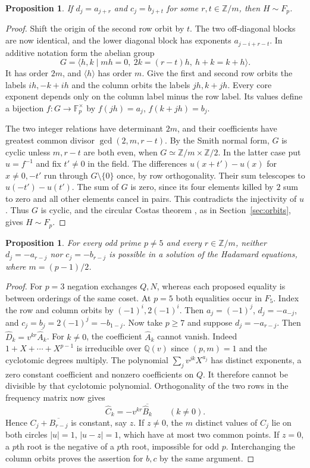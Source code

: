 \documentclass[11pt,a4paper]{article}
\newtheorem{proposition}[theorem]{Proposition}
\numberwithin{equation}{section}
\begin{document}
\begin{proposition}\label{prime:shifts}
If $d_j=a_{j+r}$ and $c_j=b_{j+t}$ for some $r,t\in\mathbb Z/m$, then $H\sim F_p$.
\end{proposition}
\begin{proof}
Shift the origin of the second row orbit by $t$. The two off-diagonal blocks are now identical, and the lower diagonal block has exponents $a_{j-i+r-t}$. In additive notation form the abelian group
$$G=\langle h,k\mid mh=0,\ 2k=(r-t)h,\ h+k=k+h\rangle.$$
It has order $2m$, and $\langle h\rangle$ has order $m$. Give the first and second row orbits the labels $ih,-k+ih$ and the column orbits the labels $jh,k+jh$. Every core exponent depends only on the column label minus the row label. Its values define a bijection $f:G\to\mathbb F_p^\times$ by $f(jh)=a_j$, $f(k+jh)=b_j$.

The two integer relations have determinant $2m$, and their coefficients have greatest common divisor $\gcd(2,m,r-t)$. By the Smith normal form, $G$ is cyclic unless $m,r-t$ are both even, when $G\simeq\mathbb Z/m\times\mathbb Z/2$. In the latter case put $u=f^{-1}$ and fix $t'\ne0$ in the field. The differences $u(x+t')-u(x)$ for $x\ne0,-t'$ run through $G\setminus\{0\}$ once, by row orthogonality. Their sum telescopes to $u(-t')-u(t')$. The sum of $G$ is zero, since its four elements killed by $2$ sum to zero and all other elements cancel in pairs. This contradicts the injectivity of $u$. Thus $G$ is cyclic, and the circular Costas theorem \cite[Theorem~3.4]{costas}, as in Section~\ref{sec:orbits}, gives $H\sim F_p$.
\end{proof}

\begin{proposition}\label{prime:negated}
For every odd prime $p\ne5$ and every $r\in\mathbb Z/m$, neither $d_j=-a_{r-j}$ nor $c_j=-b_{r-j}$ is possible in a solution of the Hadamard equations, where $m=(p-1)/2$.
\end{proposition}
\begin{proof}
For $p=3$ negation exchanges $Q,N$, whereas each proposed equality is between orderings of the same coset. At $p=5$ both equalities occur in $F_5$. Index the row and column orbits by $(-1)^i,2(-1)^i$. Then $a_j=(-1)^j$, $d_j=-a_{-j}$, and $c_j=b_j=2(-1)^j=-b_{1-j}$. Now take $p\ge7$ and suppose $d_j=-a_{r-j}$. Then $\widehat D_k=v^{kr}\overline{\widehat A_k}$. For $k\ne0$, the coefficient $\widehat A_k$ cannot vanish. Indeed $1+X+\cdots+X^{p-1}$ is irreducible over $\mathbb Q(v)$ since $(p,m)=1$ and the cyclotomic degrees multiply. The polynomial $\sum_j v^{jk}X^{a_j}$ has distinct exponents, a zero constant coefficient and nonzero coefficients on $Q$. It therefore cannot be divisible by that cyclotomic polynomial. Orthogonality of the two rows in the frequency matrix now gives
$$\widehat C_k=-v^{kr}\overline{\widehat B_k}\qquad(k\ne0).$$
Hence $C_j+\overline{B_{r-j}}$ is constant, say $z$. If $z\ne0$, the $m$ distinct values of $C_j$ lie on both circles $|u|=1$, $|u-z|=1$, which have at most two common points. If $z=0$, a $p$th root is the negative of a $p$th root, impossible for odd $p$. Interchanging the column orbits proves the assertion for $b,c$ by the same argument.
\end{proof}
\end{document}

